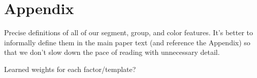 \section*{Appendix}
\label{sec:appendix}

Precise definitions of all of our segment, group, and color features. It's better to informally define them in the main paper text (and reference the Appendix) so that we don't slow down the pace of reading with unnecessary detail.

Learned weights for each factor/template?